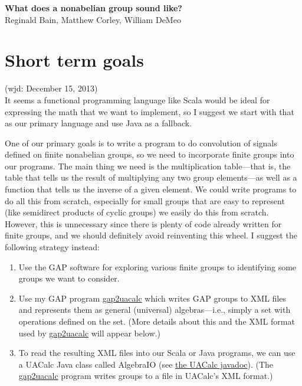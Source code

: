 \documentclass[11pt]{article}
\begin{document}
\begin{center}
{\bf What does a nonabelian group sound like?}\\
Reginald Bain, Matthew Corley, William DeMeo
\end{center}

\section{Short term goals}

(wjd: December 15, 2013)\\[5pt]
It seems a functional programming language like Scala would be ideal
for expressing the math that we want to implement, so I suggest we
start with that as our primary language and use Java as a fallback. 

One of our primary goals is to write a program to do convolution of signals
defined on finite nonabelian groups, so we need to incorporate finite
groups into our programs.  
The main thing we need is the multiplication table---that is, the table that
tells us the result of multiplying any two group elements---as well as
a function that tells us the inverse of a given element.
We could write programs to do all this from scratch, especially for small groups
that are easy to represent (like semidirect products of cyclic groups) we easily
do this from scratch. 
However, this is unnecessary since there is plenty of code already written for
finite groups, and we should definitely avoid reinventing this wheel.
I suggest the following strategy instead:
\begin{enumerate}
\item Use the \acs{GAP} software for exploring various finite groups to
  identifying some groups we want to consider.
\item Use my \acs{GAP} program
  \href{http://universalalgebra.wordpress.com/documentation/gap/gap-and-uacalc/}{gap2uacalc}
  which writes \acs{GAP} groups to \acs{XML} files and represents them as general (universal)
  algebras---i.e., simply a set with operations defined on the set. 
  (More details about this and the \acs{XML} format used by 
\href{http://universalalgebra.wordpress.com/documentation/gap/gap-and-uacalc/}{gap2uacalc}
 will appear below.)
\item To read the resulting \acs{XML} files into our Scala or Java programs,
  we can use a UACalc Java class called AlgebraIO 
  (see \href{http://uacalc.org/doc/}{the UACalc javadoc}). (The
  \href{http://universalalgebra.wordpress.com/documentation/gap/gap-and-uacalc/}{gap2uacalc}
  program writes groups to a file in UACalc's \acs{XML} format.)
\end{enumerate}
\end{document}
